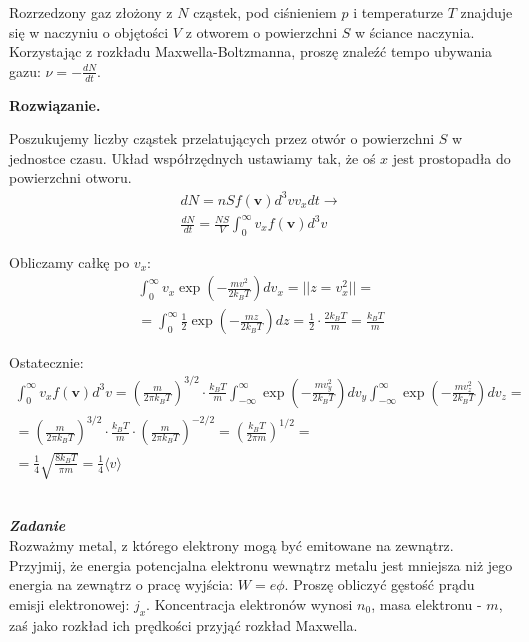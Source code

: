 \documentclass[11pt,a4paper]{article}
\newcounter{zadanie}\newcommand{\zadanie}[1][]{\addtocounter{zadanie}{1} ~\\  {\bf \emph{Zadanie \arabic{zadanie} #1 }} \\}
\newenvironment{solution}{\vspace{1cm} \par\textbf{Rozwiązanie.} \vspace{1cm}}{}
\begin{document}
Rozrzedzony gaz złożony z $N$ cząstek, pod ciśnieniem $p$ i temperaturze $T$
znajduje się w naczyniu o objętości $V$ z otworem o powierzchni $S$ 
w ściance naczynia. Korzystając z rozkładu Maxwella-Boltzmanna, 
proszę znaleźć tempo ubywania gazu: $\nu = -\frac{dN}{dt}$.

\begin{solution}

Poszukujemy liczby cząstek przelatujących przez otwór o powierzchni $S$ 
w jednostce czasu. Układ współrzędnych ustawiamy tak, że oś $x$ jest 
prostopadła do powierzchni otworu.
\begin{align*}
   dN = n S f(\mathbf{v}) d^3v  v_{x} dt \to \\ 
   \frac{dN}{dt} =  \frac{NS}{V} \int_0^\infty v_x f(\mathbf{v}) d^{3}v 
\end{align*}

Obliczamy całkę po $v_x$:
\begin{align*}
  \int_0^\infty v_x \exp\left( -\frac{m v^2}{2 k_B T} \right) dv_x = || z = v_{x}^2 || = \\
  = \int_0^\infty \frac{1}{2} \exp\left( -\frac{m z}{2 k_B T} \right) dz = 
   \frac{1}{2} \cdot \frac{2 k_B T}{m} = \frac{k_B T}{m}
\end{align*}

Ostatecznie:
\begin{align*}
 \int_0^\infty v_x f(\mathbf{v}) d^{3}v = \left( \frac{m}{2\pi k_B T} \right)^{3/2} \cdot \frac{k_B T}{m} \int_{-\infty}^\infty \exp\left( -\frac{m v_y^2}{2 k_B T} \right) dv_y \int_{-\infty}^\infty \exp\left( -\frac{m v_z^2}{2 k_B T} \right) dv_z = \\
  = \left( \frac{m}{2\pi k_B T} \right)^{3/2} \cdot \frac{k_B T}{m} \cdot 
  \left( \frac{m}{2\pi k_B T} \right)^{-2/2} = \left( \frac{k_B T}{2\pi m} \right)^{1/2} = \\
  = \frac{1}{4} \sqrt{\frac{8 k_B T}{\pi m}} = \frac{1}{4} \langle v \rangle
\end{align*}

\newpage
\end{solution}
\zadanie[]


Rozważmy metal, z którego elektrony mogą być emitowane na zewnątrz.
Przyjmij, że energia potencjalna elektronu wewnątrz metalu jest mniejsza niż jego 
energia na zewnątrz o pracę wyjścia: $W = e\phi$. Proszę 
obliczyć gęstość prądu emisji elektronowej:  $j_x$. Koncentracja elektronów wynosi 
$n_0$, masa elektronu - $m$, zaś jako rozkład ich prędkości przyjąć rozkład Maxwella.
\end{document}
